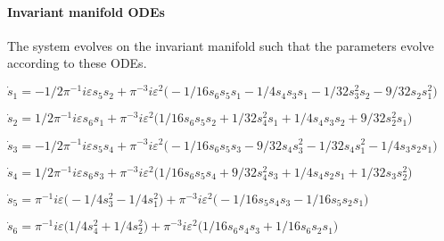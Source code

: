 \documentclass[11pt,a5paper]{article}
\def\eps{\varepsilon}
\begin{document}
\(
\)
\paragraph{Invariant manifold ODEs}
The system evolves on the invariant manifold such
that the parameters evolve according to these ODEs.
\(
\)\par

\(\dot s_{1}=-1/2 \pi ^{-1} i \eps s_{5} s_{2}+\pi ^{-3} i \eps^{2} \big(-
1/16 s_{6} s_{5} s_{1}-1/4 s_{4} s_{3} s_{1}-1/32 s_{3}^{2} s_{2}-9/32 s
_{2} s_{1}^{2}\big)
\)\par

\(\dot s_{2}=1/2 \pi ^{-1} i \eps s_{6} s_{1}+\pi ^{-3} i \eps^{2} \big(1/
16 s_{6} s_{5} s_{2}+1/32 s_{4}^{2} s_{1}+1/4 s_{4} s_{3} s_{2}+9/32 s_{
2}^{2} s_{1}\big)
\)\par

\(\dot s_{3}=-1/2 \pi ^{-1} i \eps s_{5} s_{4}+\pi ^{-3} i \eps^{2} \big(-
1/16 s_{6} s_{5} s_{3}-9/32 s_{4} s_{3}^{2}-1/32 s_{4} s_{1}^{2}-1/4 s_{
3} s_{2} s_{1}\big)
\)\par

\(\dot s_{4}=1/2 \pi ^{-1} i \eps s_{6} s_{3}+\pi ^{-3} i \eps^{2} \big(1/
16 s_{6} s_{5} s_{4}+9/32 s_{4}^{2} s_{3}+1/4 s_{4} s_{2} s_{1}+1/32 s_{
3} s_{2}^{2}\big)
\)\par

\(\dot s_{5}=\pi ^{-1} i \eps \big(-1/4 s_{3}^{2}-1/4 s_{1}^{2}\big)+\pi 
^{-3} i \eps^{2} \big(-1/16 s_{5} s_{4} s_{3}-1/16 s_{5} s_{2} s_{1}
\big)
\)\par

\(\dot s_{6}=\pi ^{-1} i \eps \big(1/4 s_{4}^{2}+1/4 s_{2}^{2}\big)+\pi ^{
-3} i \eps^{2} \big(1/16 s_{6} s_{4} s_{3}+1/16 s_{6} s_{2} s_{1}\big)
\)\par
\end{document}
